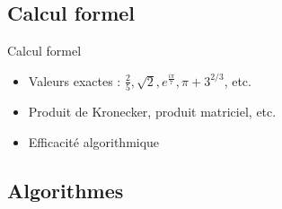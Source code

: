 \documentclass[french]{beamer}
\begin{document}
\subsection{Calcul formel}


\begin{frame}{Calcul formel}
    \begin{itemize}
        \item<1-> Valeurs exactes : $\frac 2 5, \sqrt 2, e^{\frac{i\pi}{7}}, \pi + 3^{2/3}$, etc.
        \item<2-> Produit de Kronecker, produit matriciel, etc.
        \item<3-> Efficacité algorithmique
    \end{itemize}
\end{frame}

\subsection{Algorithmes}
\end{document}
